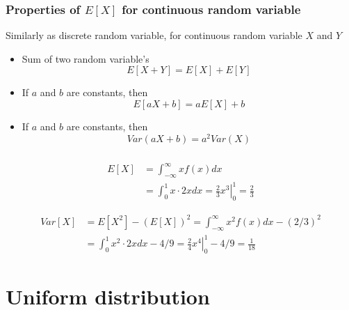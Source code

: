 \documentclass[slidestop,compress,mathserif]{beamer}
\begin{document}
\begin{frame}\frametitle{Properties of $E[X]$ for continuous random variable}
Similarly as discrete random variable, for continuous random variable $X$ and $Y$

\begin{itemize}

\item Sum of two random variable's \[ E[X+Y] = E[X]+E[Y] \]


\item If $a$ and $b$ are constants, then
\[ E[aX+b] = a E[X] + b \]

\item If $a$ and $b$ are constants, then
\[ Var(aX+b) = a^2 Var(X) \]

\end{itemize}

\end{frame}

\begin{frame}\frametitle{}

\pause
\begin{align*}
E[X] & = \int_{-\infty}^{\infty} x f(x)dx\\
& =  \int_{0}^{1} x \cdot 2x dx = \left. \frac{2}{3} x^3 \right|_0^1 = \frac{2}{3}
\end{align*}

\pause
\begin{align*}
Var[X] & = E[X^2] - (E[X])^2  = \int_{-\infty}^{\infty} x^2 f(x)dx - (2/3)^2\\
& =  \int_{0}^{1} x^2 \cdot 2x dx - 4/9= \left. \frac{2}{4} x^4 \right|_0^1 - 4/9= \frac{1}{18}
\end{align*}



\end{frame}

\section{Uniform distribution}
\end{document}
